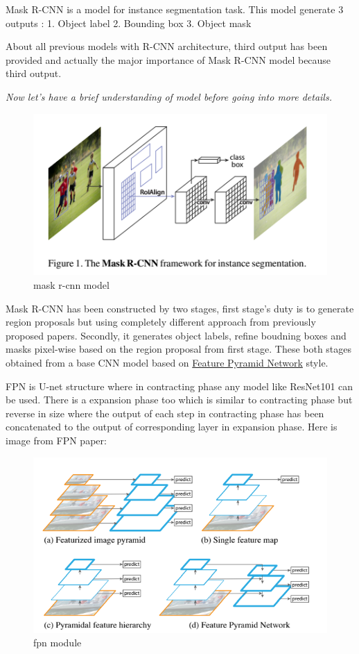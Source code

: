\documentclass[11pt]{article}
\makeatletter
\def\maxwidth{\ifdim\Gin@nat@width>\linewidth\linewidth
    \else\Gin@nat@width\fi}
\let\Oldincludegraphics\includegraphics
\renewcommand{\includegraphics}[1]{\Oldincludegraphics[width=.8\maxwidth]{#1}}
\makeatother
\begin{document}
Mask R-CNN is a model for instance segmentation task. This model
generate 3 outputs : 1. Object label 2. Bounding box 3. Object mask

About all previous models with R-CNN architecture, third output has been
provided and actually the major importance of Mask R-CNN model because
third output.

\emph{Now let's have a brief understanding of model before going into
more details.}

\begin{figure}
\centering
\includegraphics{wiki/2_3.png}
\caption{mask r-cnn model}
\end{figure}

Mask R-CNN has been constructed by two stages, first stage's duty is to
generate region proposals but using completely different approach from
previously proposed papers. Secondly, it generates object labels, refine
boudning boxes and masks pixel-wise based on the region proposal from
first stage. These both stages obtained from a base CNN model based on
\href{https://arxiv.org/abs/1612.03144}{Feature Pyramid Network} style.

FPN is U-net structure where in contracting phase any model like
ResNet101 can be used. There is a expansion phase too which is similar
to contracting phase but reverse in size where the output of each step
in contracting phase has been concatenated to the output of
corresponding layer in expansion phase. Here is image from FPN paper:

\begin{figure}
\centering
\includegraphics{wiki/2_1.png}
\caption{fpn module}
\end{figure}
\end{document}
